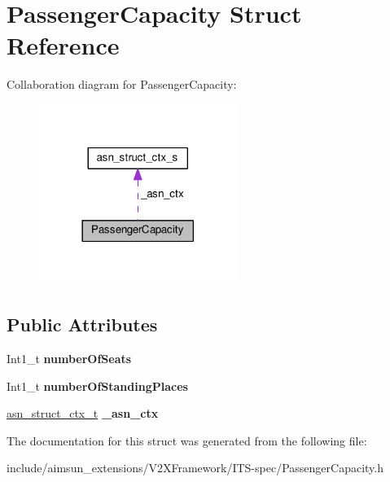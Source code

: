 \hypertarget{structPassengerCapacity}{}\section{Passenger\+Capacity Struct Reference}
\label{structPassengerCapacity}


Collaboration diagram for Passenger\+Capacity\+:\nopagebreak
\begin{figure}[H]
\begin{center}
\leavevmode
\includegraphics[width=182pt]{structPassengerCapacity__coll__graph}
\end{center}
\end{figure}
\subsection*{Public Attributes}
\begin{DoxyCompactItemize}
\item 
Int1\+\_\+t {\bfseries number\+Of\+Seats}\hypertarget{structPassengerCapacity_ae1d61b2b7839ef467472ce7b5224578d}{}\label{structPassengerCapacity_ae1d61b2b7839ef467472ce7b5224578d}

\item 
Int1\+\_\+t {\bfseries number\+Of\+Standing\+Places}\hypertarget{structPassengerCapacity_ae34fcd6fac3b2eec79838bc549bf6be4}{}\label{structPassengerCapacity_ae34fcd6fac3b2eec79838bc549bf6be4}

\item 
\hyperlink{structasn__struct__ctx__s}{asn\+\_\+struct\+\_\+ctx\+\_\+t} {\bfseries \+\_\+asn\+\_\+ctx}\hypertarget{structPassengerCapacity_a72cf9708e1259d5a1bb3f2ed2df0db41}{}\label{structPassengerCapacity_a72cf9708e1259d5a1bb3f2ed2df0db41}

\end{DoxyCompactItemize}


The documentation for this struct was generated from the following file\+:\begin{DoxyCompactItemize}
\item 
include/aimsun\+\_\+extensions/\+V2\+X\+Framework/\+I\+T\+S-\/spec/Passenger\+Capacity.\+h\end{DoxyCompactItemize}
